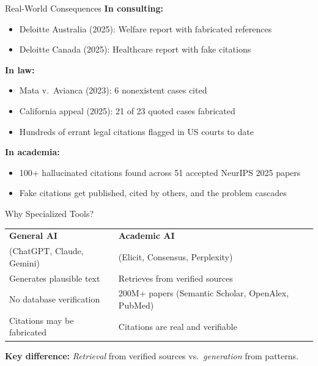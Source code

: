 \documentclass[aspectratio=169]{beamer}
\begin{document}
  \begin{frame}{Real-World Consequences}
      \textbf{In consulting:}
      \begin{itemize}
          \item Deloitte Australia (2025): Welfare report with fabricated references
          \item Deloitte Canada (2025): Healthcare report with fake citations
      \end{itemize}

      \vspace{0.5em}
      \textbf{In law:}
      \begin{itemize}
          \item Mata v.\ Avianca (2023): 6 nonexistent cases cited
          \item California appeal (2025): 21 of 23 quoted cases fabricated
          \item Hundreds of errant legal citations flagged in US courts to date
      \end{itemize}

      \vspace{0.5em}
      \textbf{In academia:}
      \begin{itemize}
          \item 100+ hallucinated citations found across 51 accepted NeurIPS 2025 papers
          \item Fake citations get published, cited by others, and the problem cascades
      \end{itemize}
  \end{frame}


  \begin{frame}{Why Specialized Tools?}
      \begin{table}
          \centering
          \begin{tabular}{p{6cm}p{6cm}}
              \toprule
              \textbf{General AI} & \textbf{Academic AI} \\
              \footnotesize (ChatGPT, Claude, Gemini) & \footnotesize (Elicit, Consensus, Perplexity) \\
              \midrule
              Generates plausible text & Retrieves from verified sources \\
              No database verification & 200M+ papers (Semantic Scholar, OpenAlex, PubMed) \\
              Citations may be fabricated & Citations are real and verifiable \\
              \bottomrule
          \end{tabular}
      \end{table}

      \vspace{1em}
      \textbf{Key difference:} \textit{Retrieval} from verified sources vs.\ \textit{generation} from patterns.
  \end{frame}
\end{document}

